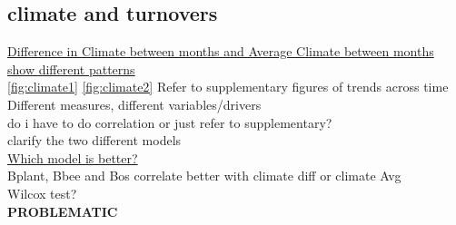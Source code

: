\documentclass[11pt]{article}
\begin{document}
\subsection{climate and turnovers}
\underline{Difference in Climate between months and Average Climate between months show different patterns}\\ \autoref{fig:climate1} \autoref{fig:climate2} Refer to supplementary figures of trends across time \\
Different measures, different variables/drivers\\
do i have to do correlation or just refer to supplementary? \\
clarify the two different models \\ 

\newpage
\underline{Which model is better?} \\
Bplant, Bbee and Bos correlate better with climate diff or climate Avg \\
Wilcox test? \\
\textbf{PROBLEMATIC}

%
%
%


\begin{figure}[H]
  \label{fig:plant-bee}
\end{figure}
\end{document}
